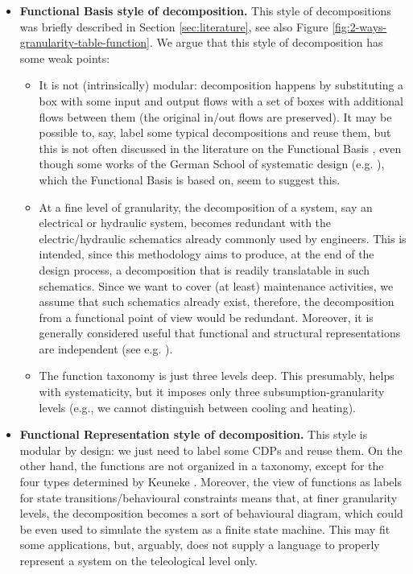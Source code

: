 \documentclass[
]{ceurart}
\begin{document}
\begin{itemize}
  \item \textbf{Functional Basis style of decomposition.} This style of decompositions was briefly described in Section \ref{sec:literature}, see also Figure \ref{fig:2-ways-granularity-table-function}. We argue that this style of decomposition has some weak points:
  \begin{itemize}
    \item It is not (intrinsically) modular: decomposition happens by substituting a box with some input and output flows with a set of boxes with additional flows between them (the original in/out flows are preserved). It may be possible to, say, label some typical decompositions and reuse them, but this is not often discussed in the literature on the Functional Basis , even though some works of the German School of systematic design (e.g. \cite{rothKonstruierenMitKonstruktionskatalogen2000}), which the Functional Basis is based on, seem to suggest this.
    \item At a fine level of granularity, the decomposition of a system, say an electrical or hydraulic system, becomes redundant with the electric/hydraulic schematics already commonly used by engineers. This is intended, since this methodology aims to produce, at the end of the design process, a decomposition that is readily translatable in such schematics. Since we want to cover (at least) maintenance activities, we assume that such schematics already exist, therefore, the decomposition from a functional point of view would be redundant. Moreover, it is generally considered useful that functional and structural representations are independent (see e.g. \cite{ISOIEC8134612009}).
    \item The function taxonomy is just three levels deep. This presumably, helps with systematicity, but it imposes only three subsumption-granularity levels (e.g., we cannot distinguish between cooling and heating).
  \end{itemize}
  \item \textbf{Functional Representation style of decomposition.} This style is modular by design: we just need to label some CDPs and reuse them. On the other hand, the functions are not organized in a taxonomy, except for the four types determined by Keuneke \cite{keuneke_device_1991}. Moreover, the view of functions as labels for state transitions/behavioural constraints means that, at finer granularity levels, the decomposition becomes a sort of behavioural diagram, which could be even used to simulate the system as a finite state machine. This may fit some applications, but, arguably, does not supply a language to properly represent a system on the teleological level only. %

\end{itemize}
\end{document}
